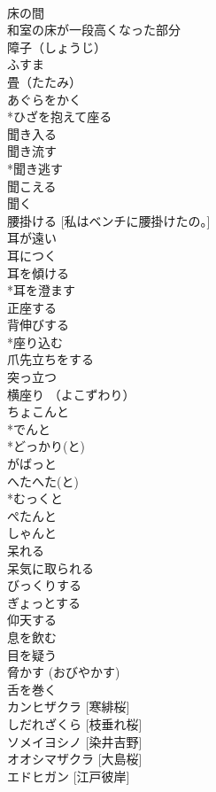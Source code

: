 \documentclass[8pt]{extreport}
\begin{document}
\begin{CJK}{UTF8}{min}
\\	床の間 
\\	和室の床が一段高くなった部分
\\	障子（しょうじ） 
\\	ふすま 
\\	畳（たたみ）
\\	あぐらをかく
\\	*ひざを抱えて座る
\\	聞き入る
\\	聞き流す
\\	*聞き逃す
\\	聞こえる
\\	聞く
\\	腰掛ける [私はベンチに腰掛けたの。]
\\	耳が遠い
\\	耳につく
\\	耳を傾ける
\\	*耳を澄ます
\\	正座する
\\	背伸びする
\\	*座り込む
\\	爪先立ちをする
\\	突っ立つ
\\	横座り （よこずわり）
\\	ちょこんと
\\	*でんと
\\	*どっかり(と)
\\	がばっと
\\	へたへた(と)
\\	*むっくと
\\	ぺたんと
\\	しゃんと
\\	呆れる
\\	呆気に取られる
\\	びっくりする
\\	ぎょっとする
\\	仰天する
\\	息を飲む
\\	目を疑う
\\	脅かす (おびやかす)
\\	舌を巻く
\\	カンヒザクラ [寒緋桜] 
\\	しだれざくら [枝垂れ桜] 
\\	ソメイヨシノ [染井吉野] 
\\	オオシマザクラ [大島桜] 
\\	エドヒガン [江戸彼岸] 

\end{CJK}
\end{document}
